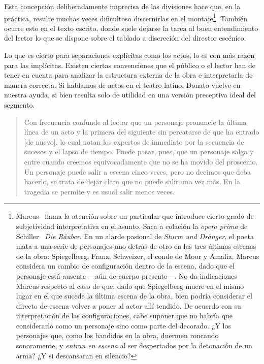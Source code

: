 Esta concepción deliberadamente imprecisa de las divisiones hace que, en la práctica, resulte muchas veces dificultoso discernirlas en el montaje\footnote{Marcus~\parencite*[327-328]{marcus1973} llama la atención sobre un particular que introduce cierto grado de subjetividad interpretativa en el asunto. Saca a colación la \textit{opera prima} de Schiller~\parencite*{schiller_raeuber} \textit{Die Räuber}. En un alarde pasional de \textit{Sturm und Dränger}, el poeta mata a una serie de personajes uno detrás de otro en las tres últimas escenas de la obra: Spiegelberg, Franz, Schweizer, el conde de Moor y Amalia. Marcus  considera un cambio de configuración dentro de la escena, dado que el personaje está ausente —\nolinebreak aún de cuerpo presente\nolinebreak[4]—\nolinebreak[4]. No da indicaciones Marcus respecto al caso de que, dado que Spiegelberg muere en el mismo lugar en el que sucede la última escena de la obra, bien podría considerar el directo de escena volver a poner al actor allí tendido. De acuerdo con su interpretación de las configuraciones,  cabe suponer que no habría que considerarlo como un personaje sino como parte del decorado. ¿Y los personajes que, como los bandidos en la obra, duermen roncando sonoramente, y \textit{entran en escena} al ser despertados por la detonación de un arma? ¿Y si descansaran en silencio?}. También ocurre esto en el texto escrito, donde suele dejarse la tarea al buen entendimiento del lector lo que se dispone sobre el tablado a discreción del director escénico.

Lo que es cierto para separaciones explícitas como los actos, lo es con más razón para las implícitas. Existen ciertas convenciones que el público o el lector han de tener en cuenta para analizar la estructura externa de la obra e interpretarla de manera correcta. Si hablamos de actos en el teatro latino, Donato vuelve en nuestra ayuda, si bien resulta solo de utilidad en una versión preceptiva ideal del segmento. 
\blockquote{Con frecuencia confunde al lector que un personaje pronuncie la última línea de un acto y la primera del siguiente sin percatarse de que ha entrado [de nuevo], lo cual notan los expertos de inmediato por la secuencia de sucesos y el lapso de tiempo. Puede pasar, pues, que un personaje salga y entre cuando creemos equivocadamente que no se ha movido del proscenio. Un personaje puede salir a escena cinco veces, pero no decimos que deba hacerlo, se trata de dejar claro que no puede salir una vez más. En la tragedia se permite y es usual salir menos veces. \parencite[p. 5; traducción propia]{donatus300c}}

